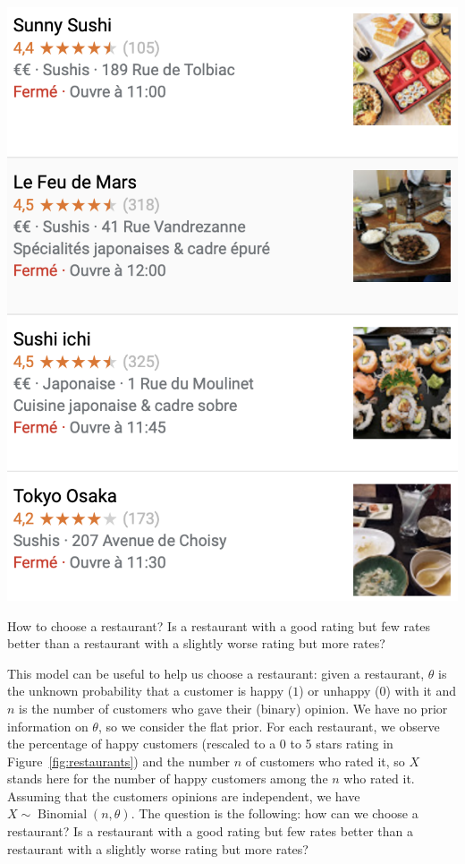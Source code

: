 \documentclass[
	fontsize=11pt, %
	twoside=false, %
	numbers=noenddot, %
]{kaobook}
\DeclareMathOperator{\bin}{Binomial}
\begin{document}
\begin{marginfigure}
	\includegraphics{images/restos.png}
	\caption{How to choose a restaurant? Is a restaurant with a good rating but few rates better than a restaurant with a slightly worse rating but more rates?}
	\label{fig:restaurants}
\end{marginfigure}
This model can be useful to help us choose a restaurant: given a restaurant, $\theta$ is the unknown probability that a customer is happy ($1$) or unhappy ($0$) with it and $n$ is the number of customers who gave their (binary) opinion.
We have no prior information on $\theta$, so we consider the flat prior.
For each restaurant, we observe the percentage of happy customers (rescaled to a 0 to 5 stars rating in Figure~\ref{fig:restaurants}) and the number $n$ of customers who rated it, so $X$ stands here for the number of happy customers among the $n$ who rated it. 
Assuming that the customers opinions are independent, we have $X \sim \bin(n, \theta)$.
The question is the following: how can we choose a restaurant? Is a restaurant with a good rating but few rates better than a restaurant with a slightly worse rating but more rates?
\end{document}
